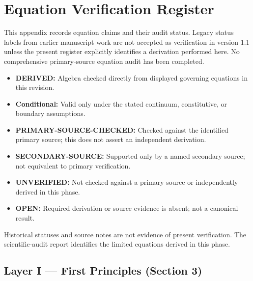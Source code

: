 \section{Equation Verification Register}
\label{app:equation_register}

This appendix records equation claims and their audit status. Legacy status labels from earlier manuscript work are not accepted as verification in version 1.1 unless the present register explicitly identifies a derivation performed here. No comprehensive primary-source equation audit has been completed.

\begin{itemize}
\item \textbf{DERIVED:} Algebra checked directly from displayed governing equations in this revision.
\item \textbf{Conditional:} Valid only under the stated continuum, constitutive, or boundary assumptions.
\item \textbf{PRIMARY-SOURCE-CHECKED:} Checked against the identified primary source; this does not assert an independent derivation.
\item \textbf{SECONDARY-SOURCE:} Supported only by a named secondary source; not equivalent to primary verification.
\item \textbf{UNVERIFIED:} Not checked against a primary source or independently derived in this phase.
\item \textbf{OPEN:} Required derivation or source evidence is absent; not a canonical result.
\end{itemize}

Historical statuses and source notes are not evidence of present verification. The scientific-audit report identifies the limited equations derived in this phase.

\subsection{Layer I — First Principles (Section 3)}

